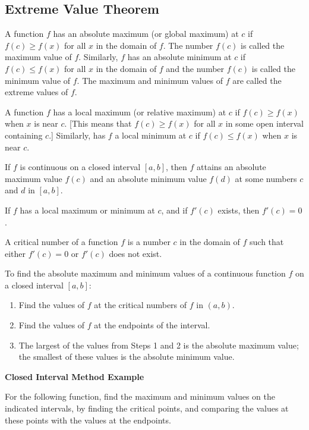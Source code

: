 \documentclass{article}
\newcommand{\theorem}[2]{\begin{tcolorbox}[title={#1},colback=blue!5!white,colframe=blue!75!black,parbox=false] #2 \end{tcolorbox}}
\begin{document}
\subsection{Extreme Value Theorem}

\theorem{Absolute Extrema}{
A function $f$ has an absolute maximum (or global maximum) at $c$ if $f(c) \geq f(x)$ for all $x$ in the domain of $f$. The number $f(c)$ is called the maximum value of $f$. Similarly, $f$ has an absolute minimum at $c$ if $f(c) \leq f(x)$ for all $x$ in the domain of $f$ and the number $f(c)$ is called the minimum value of $f$. The maximum and minimum values of $f$ are called the extreme values of $f$.
}

\theorem{Local (Relative) Extrema}{
A function $f$ has a local maximum (or relative maximum) at $c$ if $f(c) \geq f(x)$ when $x$ is near $c$. [This means that $f(c) \geq f(x)$ for all $x$ in some open interval containing $c$.] Similarly, has $f$ a local minimum at $c$ if $f(c) \leq f(x)$ when $x$ is near $c$.
}

\theorem{The Extreme Value Theorem (EVT)}{
If $f$ is continuous on a closed interval $[a, b]$, then $f$ attains an absolute maximum value $f(c)$ and an absolute minimum value $f(d)$ at some numbers $c$ and $d$ in $[a, b]$.
}

\theorem{The Fermat’s Theorem}{
If $f$ has a local maximum or minimum at $c$, and if $f'(c)$ exists, then $f'(c) = 0$.
}

\theorem{Critical Number}{
A critical number of a function $f$ is a number $c$ in the domain of $f$ such that either $f'(c) = 0$ or $f'(c)$ does not exist.
}

\theorem{The Closed Interval Method}{
To find the absolute maximum and minimum values of a continuous function $f$ on a closed interval $[a, b]$:

\begin{enumerate}
\item Find the values of $f$ at the critical numbers of $f$ in $(a, b)$.
\item Find the values of $f$ at the endpoints of the interval.
\item The largest of the values from Steps 1 and 2 is the absolute maximum value; the smallest of these values is the absolute minimum value.
\end{enumerate}
}

\textbf{Closed Interval Method Example}

For the following function, find the maximum and minimum values on the indicated intervals, by finding the critical points, and comparing the values at these points with the values at the endpoints. 
\end{document}
